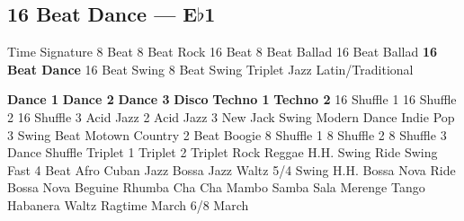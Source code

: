\subsection{16 Beat Dance --- \UiKey{\II}\UiKey{\MET}E$\flat$1}
Time Signature
8 Beat
8 Beat Rock
16 Beat
8 Beat Ballad
16 Beat Ballad
\textbf{16 Beat Dance}
16 Beat Swing
8 Beat Swing
Triplet
Jazz
Latin/Traditional





























\textbf{Dance 1}
\textbf{Dance 2}
\textbf{Dance 3}
\textbf{Disco}
\textbf{Techno 1}
\textbf{Techno 2}
16 Shuffle 1
16 Shuffle 2
16 Shuffle 3
Acid Jazz 2
Acid Jazz 3
New Jack Swing
Modern Dance
Indie Pop 3
Swing Beat
Motown
Country 2 Beat
Boogie
8 Shuffle 1
8 Shuffle 2
8 Shuffle 3
Dance Shuffle
Triplet 1
Triplet 2
Triplet Rock
Reggae
H.H. Swing
Ride Swing
Fast 4 Beat
Afro Cuban
Jazz Bossa
Jazz Waltz
5/4 Swing
H.H. Bossa Nova
Ride Bossa Nova
Beguine
Rhumba
Cha Cha
Mambo
Samba
Sala
Merenge
Tango
Habanera
Waltz
Ragtime
March
6/8 March
